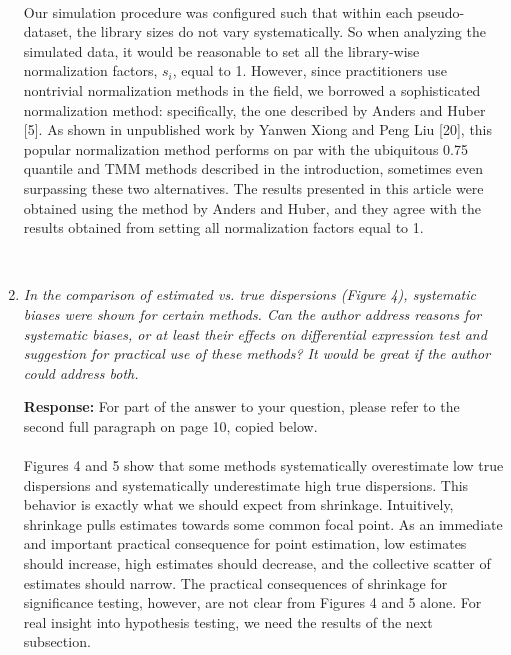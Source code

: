 \documentclass{article}
\providecommand{\q}{$\quad$ \newline}
\begin{document}
\begin{flushleft}
\begin{enumerate}
{\color{blue} \paragraph{} \indent Our simulation procedure was configured such that within each pseudo-dataset, the library sizes do not vary systematically. So when analyzing the simulated data, it would be reasonable to set all the library-wise normalization factors, $s_i$, equal to 1. However, since practitioners use nontrivial normalization methods in the field, we borrowed a sophisticated normalization method: specifically, the one described by Anders and Huber [5]. As shown in unpublished work by Yanwen Xiong and Peng Liu [20], this popular normalization method performs on par with the ubiquitous 0.75 quantile and TMM methods described in the introduction, sometimes even surpassing these two alternatives. The results presented in this article were obtained using the method by Anders and Huber, and they agree with the results obtained from setting all normalization factors equal to 1.} \q

\item \emph{In the comparison of estimated vs. true dispersions (Figure 4), systematic biases were shown for certain methods. Can the author address reasons for systematic biases, or at least their effects on differential expression test and suggestion for practical use of these methods? It would be great if the author could address both.} \q

{\bf Response:} For part of the answer to your question, please refer to the second full paragraph on page 10, copied below.

{\color{blue}\paragraph{} \indent Figures 4 and 5 show that some methods systematically overestimate low true dispersions and systematically underestimate high true dispersions. This behavior is exactly what we should expect from shrinkage. Intuitively, shrinkage pulls estimates towards some common focal point. As an immediate and important practical consequence for point estimation, low estimates should increase, high estimates should decrease, and the collective scatter of estimates should narrow. The practical consequences of shrinkage for significance testing, however, are not clear from Figures 4 and 5 alone. For real insight into hypothesis testing, we need the results of the next subsection.} \q


\end{enumerate}
\end{flushleft}
\end{document}
